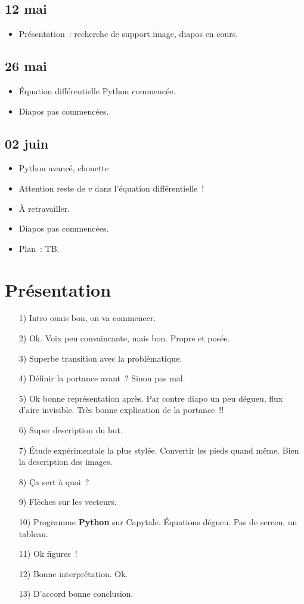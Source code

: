 \documentclass[a4paper, 11pt, final, garamond]{book}
\begin{document}
\subsection{12 mai}
\begin{itemize}
  \item Présentation~: recherche de support image, diapos en cours.
\end{itemize}

\subsection{26 mai}
\begin{itemize}
  \item Équation différentielle Python commencée.
  \item Diapos pas commencées.
\end{itemize}

\subsection{02 juin}
\begin{itemize}
  \item Python avancé, chouette
  \item Attention reste de $v$ dans l'équation différentielle~!
  \item À retravailler.
  \item Diapos pas commencées.
  \item Plan~: TB.
\end{itemize}

\section{Présentation}

\begin{enumerate}
  \item[1)] Intro ouais bon, on va commencer.
  \item[2)] Ok. Voix peu convaincante, mais bon. Propre et posée.
  \item[3)] Superbe transition avec la problématique.
  \item[4)] Définir la portance avant~? Sinon pas mal.
  \item[5)] Ok bonne représentation après. Par contre diapo un peu dégueu, flux
    d'aire invisible. Très bonne explication de la portance~!!
  \item[6)] Super description du but.
  \item[7)] Étude expérimentale la plus stylée. Convertir les pieds quand même.
    Bien la description des images.
  \item[8)] Ça sert à quoi~?
  \item[9)] Flèches sur les vecteurs.
  \item[10)] Programme \textbf{Python} sur Capytale. Équations dégueu. Pas de
    screen, un tableau.
  \item[11)] Ok figures~!
  \item[12)] Bonne interprétation. Ok.
  \item[13)] D'accord bonne conclusion.
\end{enumerate}
\end{document}
